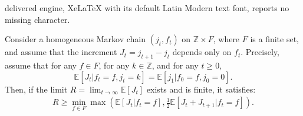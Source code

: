 \documentclass[10pt,a4paper]{amsart}
\newcommand{\ZZ}{\mathbb{Z}}
\newcommand{\esp}[1]{\mathbb{E}\left[ #1 \right]}
\begin{document}
delivered engine, XeLaTeX with its default Latin Modern text font, reports no missing character.
\begin{lemma}\label{LemMinMax}
Consider a homogeneous Markov chain $(j_t,f_t)$ on $\ZZ \times F$, where $F$ is a finite set, and assume that the increment $J_t = j_{t+1}-j_t$ depends only on $f_t$. Precisely, assume that for any $f \in F$, for any $k\in\ZZ$, and for any $t\geq 0$, $$\esp{J_t| f_t =f, j_t=k } = \esp{j_1|f_0=f,j_0=0}.$$ Then, if the limit $R = \lim_{t \to \infty} \esp{J_t}$ exists and is finite, it satisfies:
  \begin{align}\label{eq:rightminmax}
    R \geq \min_{f \in F} \max \left( \esp{J_t | f_t = f},\frac{1}{2} \esp{J_t+J_{t+1} | f_t = f} \right).
  \end{align}
\end{lemma}
\end{document}
